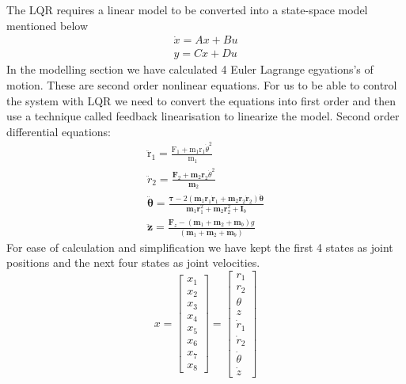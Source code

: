 \documentclass{UoNMCHA}
\numberwithin{equation}{section}
\begin{document}
	The LQR requires a linear model to be converted into a state-space model mentioned below
	$$
	\begin{array}{l}
	\dot{x}=A x+B u \\
	y=C x+D u
	\end{array}
	$$
	In the modelling section we have calculated 4 Euler Lagrange egyations's of motion. These are second
	order nonlinear equations. For us to be able to control the system with LQR we need to convert the
	equations into first order and then use a technique called feedback linearisation to linearize the model.
	Second order differential equations:
	$$
	\begin{array}{c}
	\ddot{\mathrm{r}}_{1}=\frac{\mathrm{F}_{1}+\mathrm{m}_{1} \mathrm{r}_{1} \dot{\theta}^{2}}{\mathrm{~m}_{1}} \\
	\ddot{r}_{2}=\frac{\boldsymbol{F}_{2}+\boldsymbol{m}_{2} \boldsymbol{r}_{2} \dot{\theta}^{2}}{\boldsymbol{m}_{2}} \\
	\ddot{\boldsymbol{\theta}}=\frac{\boldsymbol{\tau}-2\left(\boldsymbol{m}_{1} \boldsymbol{r}_{1} \dot{\boldsymbol{r}}_{1}+\boldsymbol{m}_{2} \boldsymbol{r}_{2} \dot{\boldsymbol{r}}_{2}\right) \dot{\boldsymbol{\theta}}}{\boldsymbol{m}_{1} \boldsymbol{r}_{1}^{2}+\boldsymbol{m}_{2} \boldsymbol{r}_{2}^{2}+\boldsymbol{I}_{b}} \\
	\ddot{\mathbf{z}}=\frac{\boldsymbol{F}_{z}-\left(\boldsymbol{m}_{1}+\boldsymbol{m}_{2}+\boldsymbol{m}_{b}\right) g}{\left(\boldsymbol{m}_{1}+\boldsymbol{m}_{2}+\boldsymbol{m}_{b}\right)}
	\end{array}
	$$
	For ease of calculation and simplification we have kept the first 4 states as joint positions and the next
	four states as joint velocities.
	$$
	x=\left[\begin{array}{l}
	x_{1} \\
	x_{2} \\
	x_{3} \\
	x_{4} \\
	x_{5} \\
	x_{6} \\
	x_{7} \\
	x_{8}
	\end{array}\right]=\left[\begin{array}{c}
	r_{1} \\
	r_{2} \\
	\theta \\
	z \\
	\dot{r}_{1} \\
	\dot{r}_{2} \\
	\dot{\theta} \\
	\dot{z}
	\end{array}\right]
	$$
	
\end{document}
